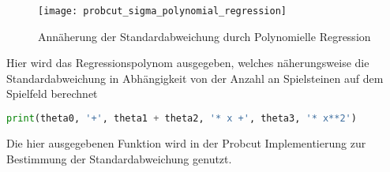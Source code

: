 \begin{figure}[h]
    \centering
    \texttt{[image: probcut\_sigma\_polynomial\_regression]}
    \caption{Annäherung der Standardabweichung durch Polynomielle Regression}
    \label{fig:probcut_sigma_polynomial_regression}
\end{figure}

Hier wird das Regressionspolynom ausgegeben, welches näherungsweise die
Standardabweichung in Abhängigkeit von der Anzahl an Spielsteinen auf
dem Spielfeld berechnet

\begin{lstlisting}[language=Python]
print(theta0, '+', theta1 + theta2, '* x +', theta3, '* x**2')
\end{lstlisting}

Die hier ausgegebenen Funktion wird in der Probcut Implementierung zur
Bestimmung der Standardabweichung genutzt.
